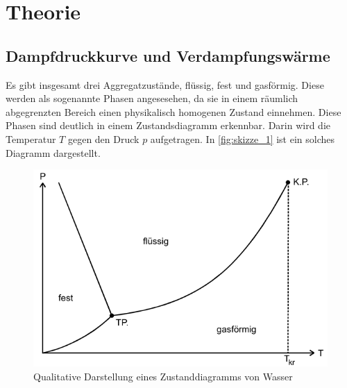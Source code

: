 \section{Theorie}
\label{sec:Theorie}



\subsection{Dampfdruckkurve und Verdampfungswärme}
\label{ssec:a}
Es gibt insgesamt drei Aggregatzustände, flüssig, fest und gasförmig.
Diese werden als sogenannte Phasen angesesehen, da sie in einem räumlich abgegrenzten Bereich einen physikalisch homogenen Zustand einnehmen.
Diese Phasen sind deutlich in einem Zustandsdiagramm erkennbar.
Darin wird die Temperatur $T$ gegen den Druck $p$ aufgetragen.
In \autoref{fig:skizze_1} ist ein solches Diagramm dargestellt.

\begin{figure}
    \centering
    \includegraphics[width=\textwidth/2]{images/bild1.png}
    \caption{Qualitative Darstellung eines Zustanddiagramms von Wasser \cite{V203}}
    \label{fig:skizze_1}
\end{figure}

